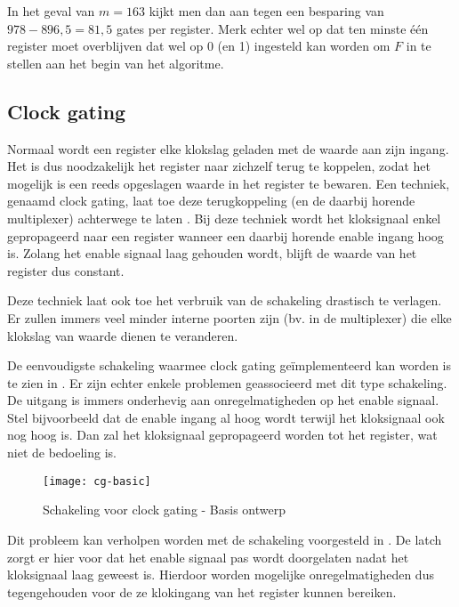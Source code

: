 In het geval van $m = 163$ kijkt men dan aan tegen een besparing van $978 - 896,5 = 81,5$ gates per register. Merk echter wel op dat ten minste \'e\'en register moet overblijven dat wel op 0 (en 1) ingesteld kan worden om $F$ in te stellen aan het begin van het algoritme.

\subsection{Clock gating\label{subsectie-implementatie-optimalisatie-clock-gating}}

Normaal wordt een register elke klokslag geladen met de waarde aan zijn ingang. Het is dus noodzakelijk het register naar zichzelf terug te koppelen, zodat het mogelijk is een reeds opgeslagen waarde in het register te bewaren. Een techniek, genaamd clock gating, laat toe deze terugkoppeling (en de daarbij horende multiplexer) achterwege te laten \cite{low-power}. Bij deze techniek wordt het kloksignaal enkel gepropageerd naar een register wanneer een daarbij horende enable ingang hoog is. Zolang het enable signaal laag gehouden wordt, blijft de waarde van het register dus constant.

Deze techniek laat ook toe het verbruik van de schakeling drastisch te verlagen. Er zullen immers veel minder interne poorten zijn (bv. in de multiplexer) die elke klokslag van waarde dienen te veranderen.

De eenvoudigste schakeling waarmee clock gating ge\"implementeerd kan worden is te zien in . Er zijn echter enkele problemen geassocieerd met dit type schakeling. De uitgang is immers onderhevig aan onregelmatigheden op het enable signaal. Stel bijvoorbeeld dat de enable ingang al hoog wordt terwijl het kloksignaal ook nog hoog is. Dan zal het kloksignaal gepropageerd worden tot het register, wat niet de bedoeling is.

\begin{figure}[h]
	\centering
		\texttt{[image: cg-basic]}
		\caption{Schakeling voor clock gating - Basis ontwerp\label{figuur-implementatie-optimalisatie-cg-basic}}
\end{figure}

Dit probleem kan verholpen worden met de schakeling voorgesteld in . De latch zorgt er hier voor dat het enable signaal pas wordt doorgelaten nadat het kloksignaal laag geweest is. Hierdoor worden mogelijke onregelmatigheden dus tegengehouden voor de ze klokingang van het register kunnen bereiken.

